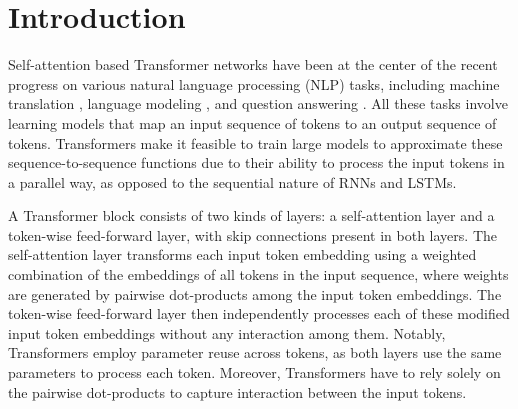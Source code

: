 

\vspace*{-5pt}
\section{Introduction}
\vspace*{-5pt}

Self-attention based Transformer networks \citep{vaswani2017attention} have been at the center of the recent progress on various natural language processing (NLP) tasks, including machine translation \citep{vaswani2017attention}, language modeling \citep{radford2018gpt,radford2019gpt2}, and question answering \citep{devlin2018bert, xlnet2019, roberta2019}. %
All these tasks involve learning models that map an input sequence of tokens to an output sequence of tokens. Transformers make it feasible to train large models to approximate these sequence-to-sequence functions due to their ability to process the input tokens in a parallel way, as opposed to the sequential %
nature of RNNs and LSTMs.


A Transformer block consists of two kinds of layers: a self-attention layer and a token-wise feed-forward layer, with skip connections present in both layers. The self-attention layer transforms each input token embedding using a weighted combination of the embeddings of all tokens in the input sequence,
where weights are generated by pairwise dot-products among the input token embeddings. The token-wise feed-forward layer then independently processes each of these modified input token embeddings without any interaction among them. 
Notably, Transformers employ parameter reuse across tokens, as both layers use the same parameters to process each token.
Moreover, Transformers have to rely solely on the pairwise dot-products to capture interaction between the input tokens.

